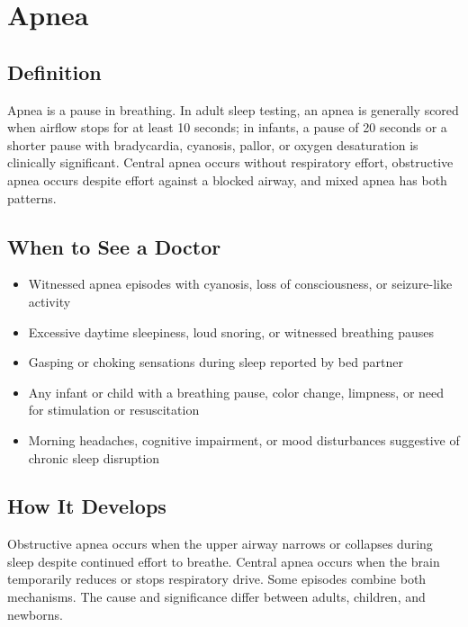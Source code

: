 \chapter{Apnea}

\section*{Definition}
Apnea is a pause in breathing. In adult sleep testing, an apnea is generally scored when airflow stops for at least 10 seconds; in infants, a pause of 20 seconds or a shorter pause with bradycardia, cyanosis, pallor, or oxygen desaturation is clinically significant. Central apnea occurs without respiratory effort, obstructive apnea occurs despite effort against a blocked airway, and mixed apnea has both patterns.

\section*{When to See a Doctor}

\begin{itemize}
 \item Witnessed apnea episodes with cyanosis, loss of consciousness, or seizure-like activity
 \item Excessive daytime sleepiness, loud snoring, or witnessed breathing pauses
 \item Gasping or choking sensations during sleep reported by bed partner
 \item Any infant or child with a breathing pause, color change, limpness, or need for stimulation or resuscitation
 \item Morning headaches, cognitive impairment, or mood disturbances suggestive of chronic sleep disruption
\end{itemize}

\section*{How It Develops}
Obstructive apnea occurs when the upper airway narrows or collapses during sleep despite continued effort to breathe. Central apnea occurs when the brain temporarily reduces or stops respiratory drive. Some episodes combine both mechanisms. The cause and significance differ between adults, children, and newborns.

